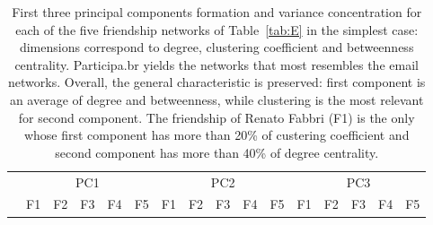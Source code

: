 \documentclass[%
 aip,
 jmp,%
 amsmath,amssymb,
 reprint,%
 floatfix,
]{revtex4-1}
\begin{document}
\begin{table}[!h]
	\caption{First three principal components formation and variance concentration for each of the five friendship networks of Table~\ref{tab:E} in the simplest case: dimensions correspond to degree, clustering coefficient and betweenness centrality. Participa.br yields the networks that most resembles the email networks. Overall, the general characteristic is preserved: first component is an average of degree and betweenness, while clustering is the most relevant for second component. The friendship of Renato Fabbri (F1) is the only whose first component has more than 20\% of custering coefficient and second component has more than 40\% of degree centrality.}
	\footnotesize
\begin{center}
\begin{tabular}{| l ||  c |c |c |c |c || c | c | c | c | c || c |c |c |c |c |	}\cline{2-16}
\multicolumn{1}{c|}{} & \multicolumn{5}{c||}{PC1}          & \multicolumn{5}{c||}{PC2} & \multicolumn{5}{c|}{PC3}  \\\cline{2-16}
	\multicolumn{1}{c|}{} & 
	F1 & F2 & F3 & F4 & F5 &	
	F1 & F2 & F3 & F4 & F5 &	
	F1 & F2 & F3 & F4 & F5 	\\\hline
	
\hline
\end{tabular}
\end{center}
\label{tab:pcaE1F}
\end{table}
\end{document}
